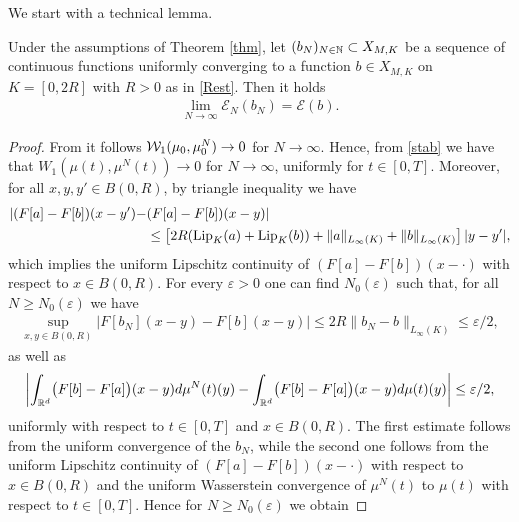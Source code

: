 We start with a technical lemma.

\begin{lemma}\label{lemma-semicontinuous-1}
	Under the assumptions of Theorem \ref{thm}, let $(b_N)_{N \in \mathbb{N}}\subset X_{M,K}$ be a sequence of continuous functions uniformly converging to a function $b \in X_{M,K}$ on $K=[0,2R]$  with $R>0$ as in \eqref{Rest}. %
Then it holds
	\begin{align*}
		\lim_{N\rightarrow\infty} \mathcal E_{N}(b_{N})= \mathcal E(b).
	\end{align*}
\end{lemma}

\begin{proof}
	From \cite[Lemma 3.3]{fornahuetter} it follows $\mathcal{W}_1(\mu_0,\mu^N_0) \rightarrow 0$ for $N \rightarrow \infty$. Hence, from \eqref{stab} we have that $W_1(\mu(t),\mu^N(t))\rightarrow 0$ for $N\rightarrow\infty$, uniformly for  $t \in [0,T]$.%
Moreover, for all $x,y,y' \in B(0,R)$, by triangle inequality we have
\begin{align*}
|(F[a] -F[ b])(x-y') - &(F[a] -F[ b])(x- y)|  \\
& \leq \left[2R (\textup{Lip}_K(a) + \textup{Lip}_K( b))    +\|a\|_{L_\infty(K)} + \| b\|_{L_\infty(K)} \right] |y-y'|,
\end{align*}
which implies the uniform Lipschitz continuity of $(F[a] -F[ b])(x- \cdot)$ with respect to $x \in B(0,R)$.
For every $\varepsilon > 0$ one can find $N_0(\varepsilon)$ such that, for all $N \geq N_0(\varepsilon)$ we have
	\begin{align*}
		\sup_{x,y \in B(0,R)}|F[ b_{N}](x-y)-F[ b](x-y)|
			\leq 2R \| b_{N}- b\|_{L_\infty(K)}\leq\varepsilon/2,
	\end{align*}
	as well as
	\begin{align*}
		\biggl|\int_{\mathbb{R}^d}\bigl(F[ b]-F[a]\bigr)(x-y)d\mu^{N}(t)(y)
			-\int_{\mathbb{R}^d}\bigl(F[ b]-F[a]\bigr)(x-y)d\mu(t)(y)\biggr|\leq\varepsilon/2,
	\end{align*}
uniformly with respect to $t \in [0,T]$ and $x \in B(0,R)$.
	The first estimate follows from  the uniform convergence of the $ b_{N}$, while the second one follows from the uniform Lipschitz continuity of
	$(F[a] -F[ b])(x- \cdot)$ with respect to $x \in B(0,R)$  and the uniform Wasserstein convergence of $\mu^{N}(t)$ to $\mu(t)$ with respect to $t \in [0,T]$. Hence for $N\geq N_0(\varepsilon)$ we obtain

\end{proof}
